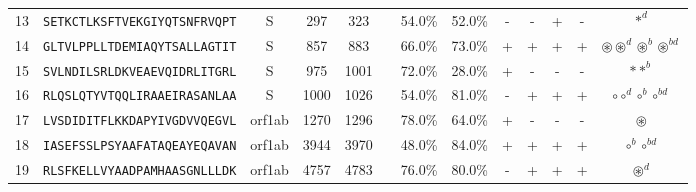 \begin{tabular}{rcccccccccccc}
13 &  \texttt{SETKCTLKSFTVEKGIYQTSNFRVQPT} &       S &    297 &   323 &                &                          54.0\% &                           52.0\% &          - &           - &          + &           - &                                                                                                                               $ \ast^d $ \\
14 &  \texttt{GLTVLPPLLTDEMIAQYTSALLAGTIT} &       S &    857 &   883 &                &                          66.0\% &                           73.0\% &          + &           + &          + &           + &                                                                             $ \circledast \circledast^d \circledast^b \circledast^{bd} $ \\
15 &  \texttt{SVLNDILSRLDKVEAEVQIDRLITGRL} &       S &    975 &  1001 &                &                          72.0\% &                           28.0\% &          + &           - &          - &           - &                                                                                                                          $ \ast \ast^b $ \\
16 &  \texttt{RLQSLQTYVTQQLIRAAEIRASANLAA} &       S &   1000 &  1026 &                &                          54.0\% &                           81.0\% &          - &           + &          + &           + &                                                                                                     $ \circ \circ^d \circ^b \circ^{bd} $ \\
17 &  \texttt{LVSDIDITFLKKDAPYIVGDVVQEGVL} &  orf1ab &   1270 &  1296 &                &                          78.0\% &                           64.0\% &          + &           - &          - &           - &                                                                                                                          $ \circledast $ \\
18 &  \texttt{IASEFSSLPSYAAFATAQEAYEQAVAN} &  orf1ab &   3944 &  3970 &                &                          48.0\% &                           84.0\% &          + &           + &          + &           + &                                                                                                                   $ \circ^b \circ^{bd} $ \\
19 &  \texttt{RLSFKELLVYAADPAMHAASGNLLLDK} &  orf1ab &   4757 &  4783 &                &                          76.0\% &                           80.0\% &          - &           + &          + &           + &                                                                                                                        $ \circledast^d $ \\

\end{tabular}
